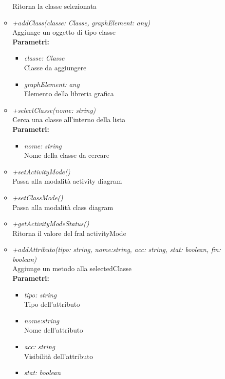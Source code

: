 \begin{itemize}
\begin{itemize}
    		Ritorna la classe selezionata
    		\item \emph{+addClass(classe: Classe, graphElement: any)}\\
    		Aggiunge un oggetto di tipo classe\\
    		\textbf{Parametri:}
    		\begin{itemize}
    			\item \emph{classe: Classe}\\
    			Classe da aggiungere
    			\item \emph{graphElement: any}\\
    			Elemento della libreria grafica
    		\end{itemize}
    		\item \emph{+selectClasse(nome: string)}\\
    		Cerca una classe all'interno della lista\\
    		\textbf{Parametri:}
    		\begin{itemize}
    			\item \emph{nome: string}\\
    			Nome della classe da cercare
    		\end{itemize}
    		\item \emph{+setActivityMode()}\\
    		Passa alla modalità activity diagram
    		\item \emph{+setClassMode()}\\
    		Passa alla modalità class diagram
    		\item \emph{+getActivityModeStatus()}\\
    		Ritorna il valore del fral activityMode
    		\item \emph{+addAttributo(tipo: string, nome:string, acc: string, stat: boolean, fin: boolean)}\\
    		Aggiunge un metodo alla selectedClasse\\
    		\textbf{Parametri:}
    		\begin{itemize}
    			\item \emph{tipo: string}\\
    			Tipo dell'attributo
    			\item \emph{nome:string}\\
    			Nome dell'attributo
    			\item \emph{acc: string}\\
    			Visibilità dell'attributo
    			\item \emph{stat: boolean}\\

\end{itemize}
\end{itemize}
\end{itemize}
